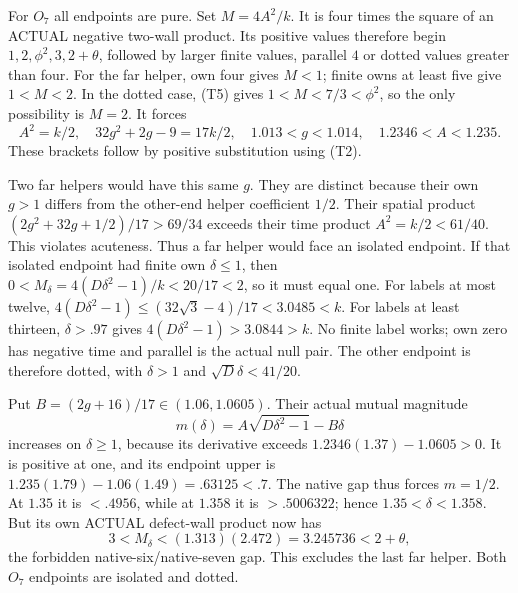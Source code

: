 For \(O_7\) all endpoints are pure.  Set \(M=4A^2/k\).
It is four times the square of an ACTUAL negative two-wall product.
Its positive values therefore begin
\(1,2,\phi^2,3,2+\theta\), followed by larger finite values,
parallel \(4\) or dotted values greater than four.
For the far helper, own four gives \(M<1\); finite owns at least
five give \(1<M<2\).  In the dotted case, (T5) gives
\(1<M<7/3<\phi^2\), so the only possibility is \(M=2\).
It forces
\[
 A^2=k/2,\quad 32g^2+2g-9=17k/2,\quad
 1.013<g<1.014,\quad1.2346<A<1.235.                 \tag{T6}
\]
These brackets follow by positive substitution using (T2).

Two far helpers would have this same \(g\).  They are distinct because
their own \(g>1\) differs from the other-end helper coefficient \(1/2\).
Their spatial
product \((2g^2+32g+1/2)/17>69/34\) exceeds their time product
\(A^2=k/2<61/40\).  This violates acuteness.  Thus a far helper
would face an isolated endpoint.
If that isolated endpoint had finite own \(\delta\le1\), then
\(0<M_\delta=4(D\delta^2-1)/k<20/17<2\), so it must equal one.
For labels at most twelve,
\(4(D\delta^2-1)\le(32\sqrt3-4)/17<3.0485<k\).
For labels at least thirteen, \(\delta>.97\) gives
\(4(D\delta^2-1)>3.0844>k\).  No finite label works; own zero
has negative time and parallel is the actual null pair.
The other endpoint is therefore dotted, with \(\delta>1\) and
\(\sqrt D\delta<41/20\).

Put \(B=(2g+16)/17\in(1.06,1.0605)\).
Their actual mutual magnitude
\[
 m(\delta)=A\sqrt{D\delta^2-1}-B\delta
\]
increases on \(\delta\ge1\), because its derivative exceeds
\(1.2346(1.37)-1.0605>0\).
It is positive at one, and its endpoint upper is
\(1.235(1.79)-1.06(1.49)=.63125<.7\).
The native gap thus forces \(m=1/2\).
At \(1.35\) it is \(<.4956\), while at \(1.358\) it is
\(>.5006322\); hence \(1.35<\delta<1.358\).
But its own ACTUAL defect-wall product now has
\[
 3<M_\delta<(1.313)(2.472)=3.245736<2+\theta,
\]
the forbidden native-six/native-seven gap.  This excludes the last
far helper.  Both \(O_7\) endpoints are isolated and dotted.

